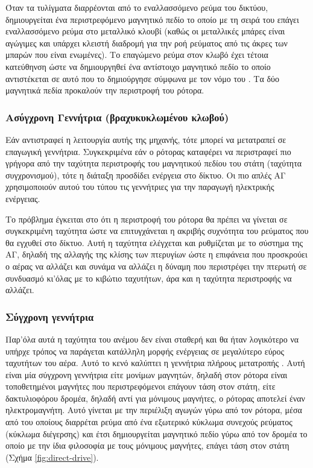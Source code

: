 \documentclass[12pt]{report}
\begin{document}
Όταν τα τυλίγματα διαρρέονται από το εναλλασσόμενο ρεύμα του δικτύου, δημιουργείται ένα περιστρεφόμενο μαγνητικό πεδίο το οποίο με τη σειρά του επάγει εναλλασσόμενο ρεύμα στο μεταλλικό κλουβί 
(καθώς οι μεταλλικές μπάρες είναι αγώγιμες και υπάρχει κλειστή διαδρομή για την ροή ρεύματος από τις άκρες των μπαρών που είναι ενωμένες).
Το επαγώμενο ρεύμα στον κλωβό έχει τέτοια κατεύθηνση ώστε να δημιουργηθεί ένα αντίστοιχο μαγνητικό πεδίο το οποίο αντιστέκεται σε αυτό που το δημιούργησε σύμφωνα με τον νόμο του {}. Τα δύο μαγνητικά πεδία  
προκαλούν την περιστροφή του ρότορα.

\subsubsection{Ασύγχρονη Γεννήτρια (βραχυκυκλωμένου κλωβού)}
Εάν αντιστραφεί η λειτουργία αυτής της μηχανής, τότε μπορεί να μετατραπεί σε επαγωγική γεννήτρια. Συγκεκριμένα εάν ο ρότορας καταφέρει να περιστραφεί πιο γρήγορα από την ταχύτητα περιστροφής του μαγνητικού πεδίου του στάτη
(ταχύτητα συγχρονισμού), τότε η διάταξη προσδίδει ενέργεια στο δίκτυο.
Οι πιο απλές ΑΓ χρησιμοποιούν αυτού του τύπου τις γεννήτριες για την παραγωγή ηλεκτρικής ενέργειας. 

Το πρόβλημα έγκειται στο ότι η περιστροφή του ρότορα θα πρέπει να γίνεται σε συγκεκριμένη ταχύτητα ώστε να επιτυγχάνεται η ακριβής συχνότητα του ρεύματος που θα εγχυθεί στο δίκτυο. 
Αυτή η ταχύτητα ελέγχεται και ρυθμίζεται με το σύστημα {} της ΑΓ, δηλαδή της αλλαγής της κλίσης των πτερυγίων ώστε η επιφάνεια που προσκρούει ο αέρας να αλλάζει και συνάμα να αλλάζει η δύναμη που περιστρέφει
την πτερωτή σε συνδυασμό κι'όλας με το κιβώτιο ταχυτήτων, άρα και η ταχύτητα περιστροφής να αλλάζει.

\subsubsection{Σύγχρονη γεννήτρια}
Παρ'όλα αυτά η ταχύτητα του ανέμου δεν είναι σταθερή και θα ήταν λογικότερο να υπήρχε τρόπος να παράγεται κατάλληλη μορφής ενέργειας σε μεγαλύτερο εύρος ταχυτήτων του αέρα. Αυτό το κενό καλύπτει η γεννήτρια πλήρους μετατροπής
{}. Αυτή είναι μία σύγχρονη γεννήτρια είτε μονίμων μαγνητών, δηλαδή στον ρότορα είναι τοποθετημένοι μαγνήτες που περιστρεφόμενοι επάγουν τάση στον στάτη, είτε δακτυλιοφόρου δρομέα, 
δηλαδή αντί για μόνιμους μαγνήτες, ο ρότορας αποτελεί έναν ηλεκτρομαγνήτη. Αυτό γίνεται με την περιέλιξη αγωγών γύρω από τον ρότορα, μέσα από του οποίους διαρρέται ρεύμα από ένα εξωτερικό κύκλωμα συνεχούς ρεύματος 
(κύκλωμα διέγερσης) και έτσι δημιουργείται μαγνητικό πεδίο γύρω από τον δρομέα το οποίο με την ίδια φιλοσοφία με τους μόνιμους μαγνήτες, επάγει τάση στον στάτη (Σχήμα \ref{fig:direct-drive}). 
\end{document}
